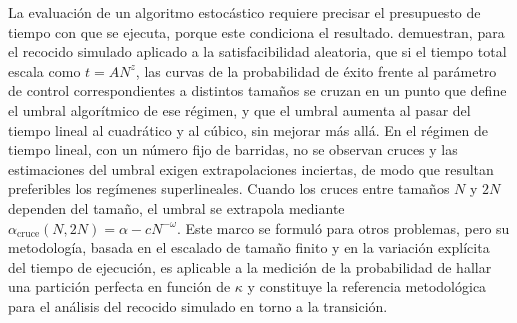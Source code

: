 La evaluación de un algoritmo estocástico requiere precisar el presupuesto de tiempo con que se ejecuta, porque este condiciona el resultado. \textcite{angelini2026} demuestran, para el recocido simulado aplicado a la satisfacibilidad aleatoria, que si el tiempo total escala como $t = A N^z$, las curvas de la probabilidad de éxito frente al parámetro de control correspondientes a distintos tamaños se cruzan en un punto que define el umbral algorítmico de ese régimen, y que el umbral aumenta al pasar del tiempo lineal al cuadrático y al cúbico, sin mejorar más allá. En el régimen de tiempo lineal, con un número fijo de barridas, no se observan cruces y las estimaciones del umbral exigen extrapolaciones inciertas, de modo que resultan preferibles los regímenes superlineales. Cuando los cruces entre tamaños $N$ y $2N$ dependen del tamaño, el umbral se extrapola mediante $\alpha_{\mathrm{cruce}}(N, 2N) = \alpha - c N^{-\omega}$. Este marco se formuló para otros problemas, pero su metodología, basada en el escalado de tamaño finito y en la variación explícita del tiempo de ejecución, es aplicable a la medición de la probabilidad de hallar una partición perfecta en función de $\kappa$ y constituye la referencia metodológica para el análisis del recocido simulado en torno a la transición.
